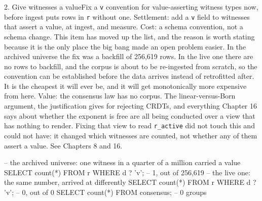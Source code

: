 \begin{Open}{2. Give witnesses a value}{Fix a \texttt{v} convention for value-asserting witness types now, before ingest puts rows in \texttt{r} without one.}
Settlement: add a \texttt{v} field to witnesses that assert a value, at ingest, and measure. Cost: a schema convention, not a schema change. This item has moved up the list, and the reason is worth stating because it is the only place the big bang made an open problem easier. In the archived universe the fix was a backfill of 256,619 rows. In the live one there are no rows to backfill, and the corpus is about to be re-ingested from scratch, so the convention can be established before the data arrives instead of retrofitted after. It is the cheapest it will ever be, and it will get monotonically more expensive from here. Value: the consensus law has no corpus. The linear-versus-Born argument, the justification  gives for rejecting CRDTs, and everything Chapter 16 says about whether the exponent is free are all being conducted over a view that has nothing to render. Fixing that view to read \texttt{r\_active} did not touch this and could not have: it changed which witnesses are counted, not whether any of them assert a value. See Chapters 8 and 16.
\begin{Check}
-- the archived universe: one witness in a quarter of a million carried a value
SELECT count(*) FROM r WHERE d ? 'v';   -- 1, out of 256,619
-- the live one: the same number, arrived at differently
SELECT count(*) FROM r WHERE d ? 'v';   -- 0, out of 0
SELECT count(*) FROM consensus;         -- 0 groups
\end{Check}
\end{Open}


